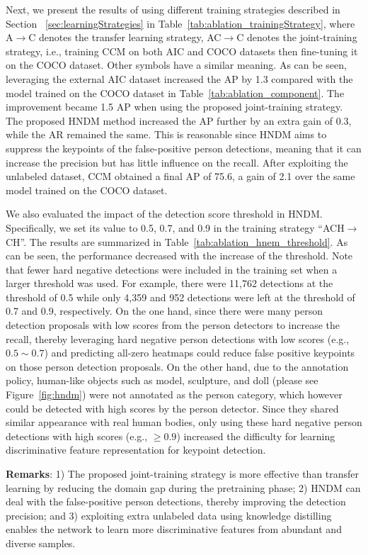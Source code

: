 \documentclass[twocolumn]{svjour3}          \smartqed  \usepackage{natbib}
\begin{document}
Next, we present the results of using different training strategies described in Section ~\ref{sec:learningStrategies} in Table~\ref{tab:ablation_trainingStrategy}, where A$\to$C denotes the transfer learning strategy, AC$\to$C denotes the joint-training strategy, i.e., training CCM on both AIC and COCO datasets then fine-tuning it on the COCO dataset. Other symbols have a similar meaning. As can be seen, leveraging the external AIC dataset increased the AP by 1.3 compared with the model trained on the COCO dataset in Table~\ref{tab:ablation_component}. The improvement became 1.5 AP when using the proposed joint-training strategy. The proposed HNDM method increased the AP further by an extra gain of 0.3, while the AR remained the same. This is reasonable since HNDM aims to suppress the keypoints of the false-positive person detections, meaning that it can increase the precision but has little influence on the recall. After exploiting the unlabeled dataset, CCM obtained a final AP of 75.6, a gain of 2.1 over the same model trained on the COCO dataset. 

We also evaluated the impact of the detection score threshold in HNDM. Specifically, we set its value to 0.5, 0.7, and 0.9 in the training strategy ``ACH$\to$CH''. The results are summarized in Table~\ref{tab:ablation_hnem_threshold}. As can be seen, the performance decreased with the increase of the threshold. Note that fewer hard negative detections were included in the training set when a larger threshold was used. For example, there were 11,762 detections at the threshold of 0.5 while only 4,359 and 952 detections were left at the threshold of 0.7 and 0.9, respectively. On the one hand, since there were many person detection proposals with low scores from the person detectors to increase the recall, thereby leveraging hard negative person detections with low scores (e.g., $0.5\sim0.7$) and predicting all-zero heatmaps could reduce false positive keypoints on those person detection proposals. On the other hand, due to the annotation policy, human-like objects such as model, sculpture, and doll (please see Figure~\ref{fig:hndm}) were not annotated as the person category, which however could be detected with high scores by the person detector. Since they shared similar appearance with real human bodies, only using these hard negative person detections with high scores (e.g., $\geq0.9$) increased the difficulty for learning discriminative feature representation for keypoint detection.

\textbf{Remarks}: 1) The proposed joint-training strategy is more effective than transfer learning by reducing the domain gap during the pretraining phase; 2) HNDM can deal with the false-positive person detections, thereby improving the detection precision; and 3) exploiting extra unlabeled data using knowledge distilling enables the network to learn more discriminative features from abundant and diverse samples. 
\end{document}
